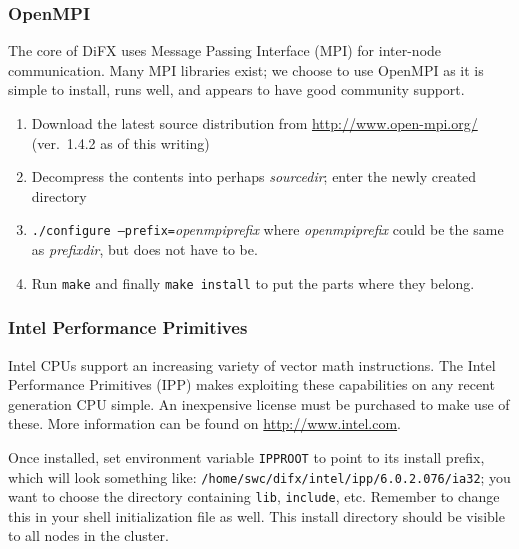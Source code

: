 
\subsubsection{OpenMPI} \label{sec:mpi}

The core of DiFX uses Message Passing Interface (MPI) for inter-node communication.
Many MPI libraries exist; we choose to use OpenMPI as it is simple to install, runs well, and appears to have good community support.
\begin{enumerate}
\item Download the latest source distribution from \url{http://www.open-mpi.org/} (ver.\ 1.4.2 as of this writing)
\item Decompress the contents into perhaps {\em sourcedir}; enter the newly created directory
\item {\tt ./configure --prefix=}{\em openmpiprefix} where {\em openmpiprefix} could be the same as {\em prefixdir}, but does not have to be.
\item Run {\tt make} and finally {\tt make install} to put the parts where they belong.
\end{enumerate}









\subsubsection{Intel Performance Primitives} \label{sec:ipp}

Intel CPUs support an increasing variety of vector math instructions.  
The Intel Performance Primitives (IPP) makes exploiting these capabilities on any recent generation CPU simple.
An inexpensive license must be purchased to make use of these.
More information can be found on \url{http://www.intel.com}.

Once installed, set environment variable {\tt IPPROOT} to point to its install prefix, which will look something like:
{\tt /home/swc/difx/intel/ipp/6.0.2.076/ia32}; you want to choose the directory containing {\tt lib}, {\tt include}, etc.
Remember to change this in your shell initialization file as well.
This install directory should be visible to all nodes in the cluster.








